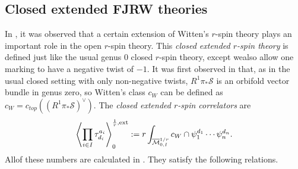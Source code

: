 \documentclass[11pt]{amsart}
\theoremstyle{definition}
\theoremstyle{remark}
\newcommand{\<}{\left<}
\renewcommand{\>}{\right>}
\numberwithin{equation}{section}
\def\Mbar{{\overline{\mathcal M}}}
\begin{document}
\subsection{Closed extended FJRW theories}\label{subsec:closed_ext_r_m}
In \cite{BCT_Closed_Extended,BCT2}, it was observed that a certain %
extension of Witten's $r$-spin theory plays an important role in the open $r$-spin theory. This \emph{closed extended $r$-spin theory} is defined just like the %
usual genus $0$ closed %
$r$-spin %
theory, except wealso allow %
one marking to have a negative twist of $-1.$ It was first observed in \cite{JKV2} that, as in the usual closed setting with only non-negative %
twists,  $R^1\pi_*\mathcal{S}$ %
is an orbifold vector bundle in genus zero, so Witten's class $c_W$ can be %
defined  as %
$c_W=c_{top}((R^1\pi_*\mathcal{S})^\vee)$. The \textit{closed extended $r$-spin correlators} %
are
\begin{equation}\label{eq:define closed ext}
\left\langle\prod_{i\in I}\tau^{a_i}_{d_i}\right\rangle^{\frac{1}{r},\text{ext}}_0:=r\int_{\Mbar^{1/r}_{0,I}} \hspace{-0cm} c_W \cap \psi_1^{d_1} \cdots \psi_n^{d_n}.
\end{equation}
 Allof these %
numbers are calculated in \cite{BCT_Closed_Extended}. They satisfy the following relations.
\end{document}
